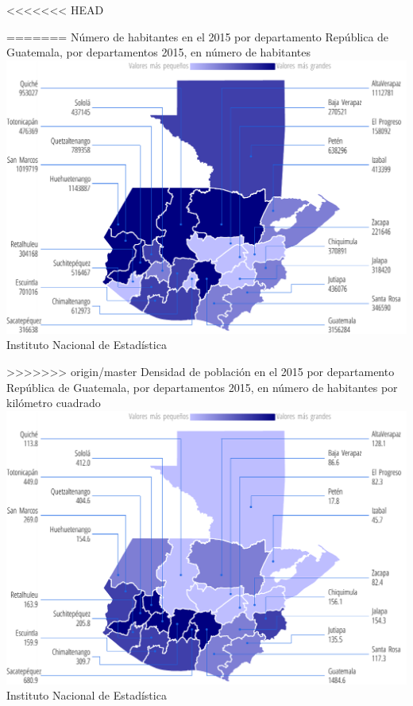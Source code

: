    
     
<<<<<<< HEAD
    
=======
     {%
     }%
     {%
     	Número de habitantes en el 2015 por departamento
     } %
     {%
     	República de Guatemala, por departamentos 2015, en número de habitantes} %
     {%
     	\includegraphics[width=52\cuadri]{graficas/1_02.pdf}}%
     {%
     	Instituto Nacional de Estadística} %
     
     
     
>>>>>>> origin/master
     {%
     }%
     {%
     	Densidad de población en el 2015 por departamento
     } %
     {%
     	República de Guatemala, por departamentos 2015, en número de habitantes por kilómetro cuadrado} %
     {%
     	\includegraphics[width=52\cuadri]{graficas/1_05.pdf}}%
     {%
     	Instituto Nacional de Estadística} %

